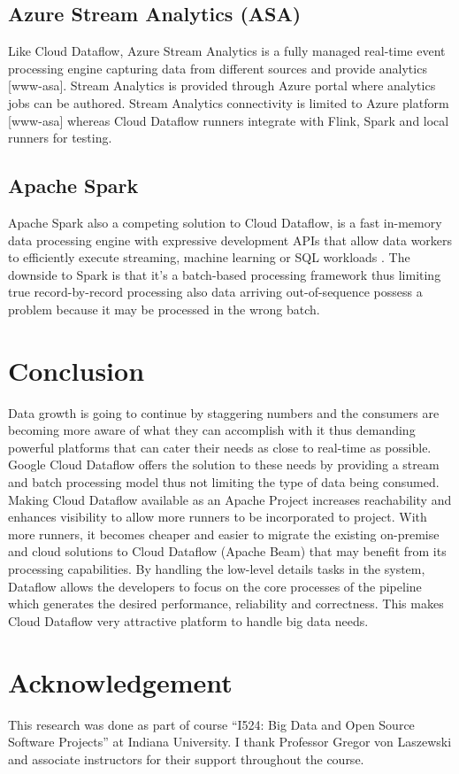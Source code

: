\documentclass[9pt,twocolumn,twoside]{styles/osajnl}
\begin{document}
\subsection{Azure Stream Analytics (ASA)}

Like Cloud Dataflow, Azure Stream Analytics is a fully managed
real-time event processing engine capturing data from different
sources and provide analytics [www-asa]. Stream Analytics is provided
through Azure portal where analytics jobs can be authored. Stream
Analytics connectivity is limited to Azure platform [www-asa] whereas
Cloud Dataflow runners integrate with Flink, Spark and local runners
for testing.

\subsection{Apache Spark}

Apache Spark also a competing solution to Cloud Dataflow, is a fast
in-memory data processing engine with expressive development APIs that
allow data workers to efficiently execute streaming, machine learning
or SQL workloads \cite{www-spark}. The downside to Spark is that it’s
a batch-based processing framework \cite{www-notstream} thus limiting
true record-by-record processing also data arriving out-of-sequence
possess a problem because it may be processed in the wrong batch.

\section{Conclusion}

Data growth is going to continue by staggering numbers and the
consumers are becoming more aware of what they can accomplish with it
thus demanding powerful platforms that can cater their needs as close
to real-time as possible. Google Cloud Dataflow offers the solution to
these needs by providing a stream and batch processing model thus not
limiting the type of data being consumed. Making Cloud Dataflow
available as an Apache Project increases reachability and enhances
visibility to allow more runners to be incorporated to project. With
more runners, it becomes cheaper and easier to migrate the existing
on-premise and cloud solutions to Cloud Dataflow (Apache Beam) that
may benefit from its processing capabilities.  By handling the
low-level details tasks in the system, Dataflow allows the developers
to focus on the core processes of the pipeline which generates the
desired performance, reliability and correctness. This makes Cloud
Dataflow very attractive platform to handle big data needs.

\section{Acknowledgement}

This research was done as part of course “I524: Big Data and Open
Source Software Projects” at Indiana University. I thank Professor
Gregor von Laszewski and associate instructors for their support
throughout the course.



 
\end{document}
